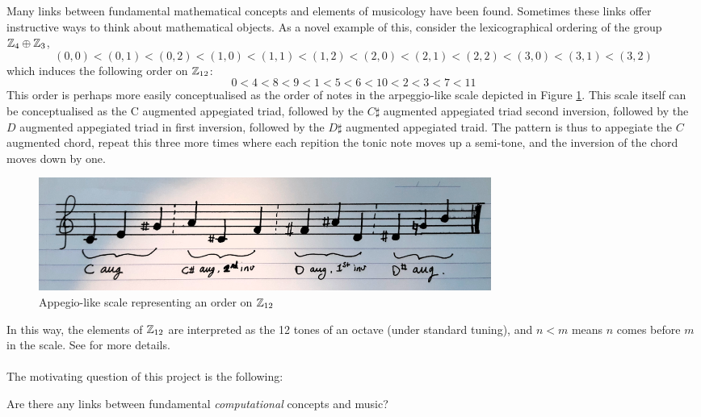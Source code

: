 Many links between fundamental mathematical concepts and elements of musicology have been found. Sometimes these links offer instructive ways to think about mathematical objects. As a novel example of this, consider the lexicographical ordering of the group $\mathbb{Z}_4 \oplus \mathbb{Z}_3$,
\[(0,0) < (0,1) < (0,2) < (1,0) < (1,1) < (1,2) < (2,0) < (2,1) < (2,2) < (3,0)< (3,1) < (3,2)\]
which induces the following order on $\mathbb{Z}_{12}$:
\begin{equation}
\label{ordering}
0 < 4 < 8 < 9 < 1 < 5 <6 < 10 < 2 < 3 < 7 < 11
\end{equation}
This order is perhaps more easily conceptualised as the order of notes in the arpeggio-like scale depicted in Figure \ref{appegiolike}. This scale itself can be conceptualised as the C augmented appegiated triad, followed by the $C\sharp$ augmented appegiated triad second inversion, followed by the $D$ augmented appegiated triad in first inversion, followed by the $D\sharp$ augmented appegiated traid. The pattern is thus to appegiate the $C$ augmented chord, repeat this three more times where each repition the tonic note moves up a semi-tone, and the inversion of the chord moves down by one.
\begin{figure}[h]
\label{appegiolike}
 \centering
 \includegraphics[width=40em]{Pictures/AppegioLikeScale.png}
 \caption{Appegio-like scale representing an order on $\mathbb{Z}_{12}$}
\end{figure}
In this way, the elements of $\mathbb{Z}_{12}$ are interpreted as the 12 tones of an octave (under standard tuning), and $n < m$ means $n$ comes before $m$ in the scale. See \cite[\S6.8.1]{Mazzola} for more details.\\\\
%
The motivating question of this project is the following:
\begin{question}
 Are there any links between fundamental \emph{computational} concepts and music?
\end{question}
